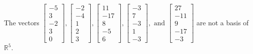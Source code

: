 \begin{exercise}
\begin{exerciseStatement}
  \end{exerciseStatement}
  \begin{exerciseAnswer}
   The vectors \(\left[\begin{array}{r}
-5 \\
3 \\
-2 \\
3 \\
0
\end{array}\right] , \left[\begin{array}{r}
-2 \\
-4 \\
1 \\
2 \\
3
\end{array}\right] , \left[\begin{array}{r}
11 \\
-17 \\
8 \\
-5 \\
6
\end{array}\right] , \left[\begin{array}{r}
-3 \\
7 \\
-3 \\
1 \\
-3
\end{array}\right] , \text{ and } \left[\begin{array}{r}
27 \\
-11 \\
9 \\
-17 \\
-3
\end{array}\right]\) 
  	 are not  a basis of \(\mathbb{R}^5\).
  


  \end{exerciseAnswer}
\end{exercise}